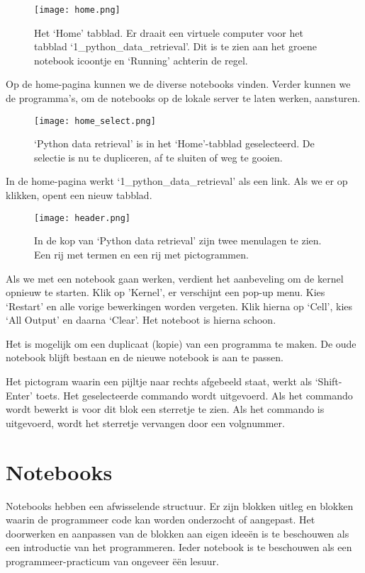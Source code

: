 \begin{figure}[H]
\texttt{[image: home.png]}
\caption{Het `Home' tabblad. Er draait een virtuele computer voor het tabblad `1\_python\_data\_retrieval'. Dit is te zien
aan het groene notebook icoontje en `Running' achterin de regel.}
\end{figure}

Op de home-pagina kunnen we de diverse notebooks vinden. Verder kunnen we de programma's, om de notebooks op de lokale server te laten werken, aansturen.

\begin{figure}[H]
\texttt{[image: home\_select.png]}
\caption{`Python data retrieval' is in het `Home'-tabblad geselecteerd. De selectie is nu te dupliceren, af te sluiten of weg te gooien.}
\end{figure}

In de home-pagina werkt `1\_python\_data\_retrieval' als een link. Als we er op klikken, opent een nieuw tabblad.

\begin{figure}[H]
\texttt{[image: header.png]}
\caption{In de kop van `Python data retrieval' zijn twee menulagen te zien. Een rij met termen en een rij met pictogrammen.}
\end{figure}

Als we met een notebook gaan werken, verdient het aanbeveling om de kernel opnieuw te starten. Klik op 'Kernel', er verschijnt een pop-up menu. Kies `Restart' en alle vorige bewerkingen worden vergeten. Klik hierna op `Cell', kies `All Output' en daarna `Clear'. Het noteboot is hierna schoon.

Het is mogelijk om een duplicaat (kopie) van een programma te maken. De oude notebook blijft bestaan en de nieuwe notebook is aan te passen.

Het pictogram waarin een pijltje naar rechts afgebeeld staat, werkt als `Shift-Enter' toets. Het geselecteerde commando wordt uitgevoerd. Als het commando wordt bewerkt is voor dit blok een sterretje te zien. Als het commando is uitgevoerd, wordt het sterretje vervangen door een volgnummer.

\section{Notebooks}

Notebooks hebben een afwisselende structuur. Er zijn blokken uitleg en blokken waarin de programmeer code kan worden onderzocht of aangepast. Het doorwerken en aanpassen van de blokken aan eigen idee\"{e}n is te beschouwen als een introductie van het programmeren. Ieder notebook is te beschouwen als een programmeer-practicum van ongeveer \"{e}\"{e}n lesuur.

